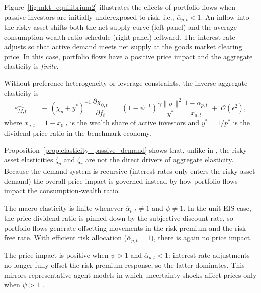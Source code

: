 Figure~\ref{fig:mkt_equilibrium2} illustrates the effects of portfolio flows when passive investors are initially underexposed to risk, i.e., $\overline{\alpha}_{p,t}<1$. An inflow into the risky asset shifts both the net supply curve (left panel) and the average consumption-wealth ratio schedule (right panel) leftward. The interest rate adjusts so that active demand meets net supply at the goods market clearing price. In this case, portfolio flows have a positive price impact and the aggregate elasticity is \textit{finite}.  

\begin{prop}\label{prop:elasticity_passive_demand}
Without preference heterogeneity or leverage constraints, the inverse aggregate elasticity is
\begin{equation}\label{eq:elasticity_passive_demand}
    \varepsilon_{M,t}^{-1}
    \;=\;
    -\,(\chi_{p}+y^*)^{-1}\,\frac{\partial \chi_{0,t}}{\partial f_t}
    \;=\;
    \left(1-\psi^{-1}\right)\frac{\gamma \|\sigma\|^{2}}{y^*}
    \frac{1-\overline{\alpha}_{p,t}}{x_{a,t}}
    \;+\;\mathcal{O}\!\left(\epsilon^{2}\right),
\end{equation}
where $x_{a,t}=1-x_{0,t}$ is the wealth share of active investors and $y^*=1/p^*$ is the dividend-price ratio in the benchmark economy.
\end{prop}

Proposition~\ref{prop:elasticity_passive_demand} shows that, unlike in \citet{gabaix2020search}, the risky-asset elasticities $\zeta_p$ and $\zeta_r$ are not the direct drivers of aggregate elasticity. Because the demand system is recursive (interest rates only enters the risky asset demand) the overall price impact is governed instead by how portfolio flows impact the consumption-wealth ratio. %


The macro elasticity is finite whenever $\overline{\alpha}_{p,t}\neq 1$ and $\psi\neq 1$. In the unit EIS case, the price-dividend ratio is pinned down by the subjective discount rate, so portfolio flows generate offsetting movements in the risk premium and the risk-free rate. With efficient risk allocation ($\overline{\alpha}_{p,t}=1$), there is again no price impact.  

The price impact is positive when $\psi>1$ and $\overline{\alpha}_{p,t}<1$: interest rate adjustments no longer fully offset the risk premium response, so the latter dominates. This mirrors representative agent models in which uncertainty shocks affect prices only when $\psi>1$ \citep[e.g.,][]{bansal2004risks}.  

